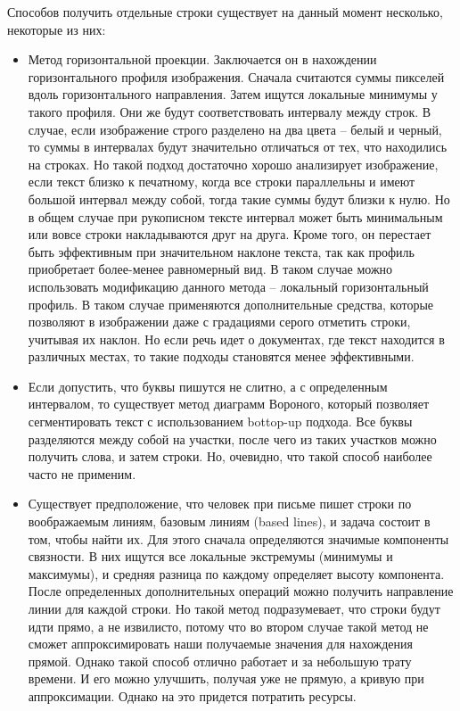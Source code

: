 Способов получить отдельные строки существует на данный момент несколько, некоторые из них:
\begin{itemize}
	\item Метод горизонтальной проекции. Заключается он в нахождении горизонтального профиля изображения. Сначала считаются суммы пикселей вдоль горизонтального направления. Затем ищутся локальные минимумы у такого профиля. Они же будут соответствовать интервалу между строк. В случае, если изображение строго разделено на два цвета – белый и черный, то суммы в интервалах будут значительно отличаться от тех, что находились на строках. Но такой подход достаточно хорошо анализирует изображение, если текст близко к печатному, когда все строки параллельны и имеют большой интервал между собой, тогда такие суммы будут близки к нулю. Но в общем случае при рукописном тексте интервал может быть минимальным или вовсе строки накладываются друг на друга. Кроме того, он перестает быть эффективным при значительном наклоне текста, так как профиль приобретает более-менее равномерный вид. В таком случае можно использовать модификацию данного метода – локальный горизонтальный профиль. В таком случае применяются дополнительные средства, которые позволяют в изображении даже с градациями серого отметить строки, учитывая их наклон. Но если речь идет о документах, где текст находится в различных местах, то такие подходы становятся менее эффективными. 
	\item Если допустить, что буквы пишутся не слитно, а с определенным интервалом, то существует метод диаграмм Вороного, который позволяет сегментировать текст с использованием bottop-up подхода. Все буквы разделяются между собой на участки, после чего из таких участков можно получить слова, и затем строки. Но, очевидно, что такой способ наиболее часто не применим.\cite{Yosef2009LineSF}
	\item Существует предположение, что человек при письме пишет строки по воображаемым линиям, базовым линиям (based lines), и задача состоит в том, чтобы найти их. Для этого сначала определяются значимые компоненты связности. В них ищутся все локальные экстремумы (минимумы и максимумы), и средняя разница по каждому определяет высоту компонента. После определенных дополнительных операций можно получить направление линии для каждой строки. Но такой метод подразумевает, что строки будут идти прямо, а не извилисто, потому что во втором случае такой метод не сможет аппроксимировать наши получаемые значения для нахождения прямой. Однако такой способ отлично работает и за небольшую трату времени. И его можно улучшить, получая уже не прямую, а кривую при аппроксимации. Однако на это придется потратить ресурсы.\cite{kim}
	
\end{itemize}

